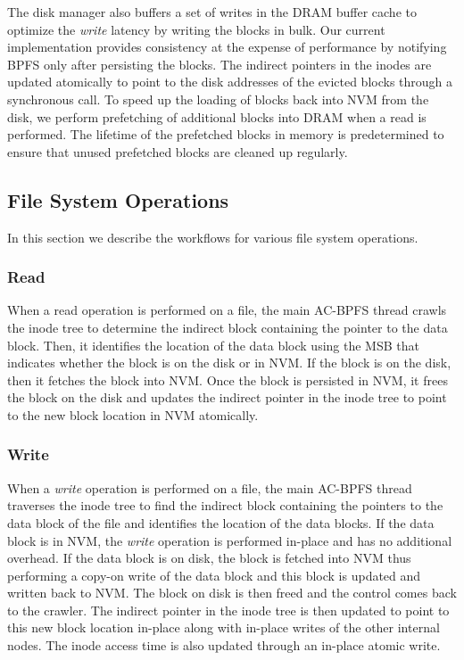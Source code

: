 The disk manager also buffers a set of writes in the DRAM buffer cache to optimize the \textit{write} latency by writing the blocks in bulk. Our current implementation provides consistency at the expense of performance by notifying BPFS only after persisting the blocks. The indirect pointers in the inodes are updated atomically to point to the disk addresses of the evicted blocks through a synchronous call. To speed up the loading of blocks back into NVM from the disk, we perform prefetching of additional blocks into DRAM when a read is performed. The lifetime of the prefetched blocks in memory is predetermined to ensure that unused prefetched blocks are cleaned up regularly.

\subsection{File System Operations}
In this section we describe the workflows for various file system operations.
\subsubsection{Read}
When a read operation is performed on a file, the main AC-BPFS thread crawls the inode tree to determine the indirect block containing the pointer to the data block. Then, it identifies the location of the data block using the MSB that indicates whether the block is on the disk or in NVM. If the block is on the disk, then it fetches the block into NVM. Once the block is persisted in NVM, it frees the block on the disk and updates the indirect pointer in the inode tree to point to the new block location in NVM atomically.

\subsubsection{Write}
When a \textit{write} operation is performed on a file, the main AC-BPFS thread traverses the inode tree to find the indirect block containing the pointers to the data block of the file and identifies the location of the data blocks. If the data block is in NVM, the \textit{write} operation is performed in-place and has no additional overhead. If the data block is on disk, the block is fetched into NVM thus performing a copy-on write of the data block and this block is updated and written back to NVM. The block on disk is then freed and the control comes back to the crawler. The indirect pointer in the inode tree is then updated to point to this new block location in-place along with in-place writes of the other internal nodes. The inode access time is also updated through an in-place atomic write.


